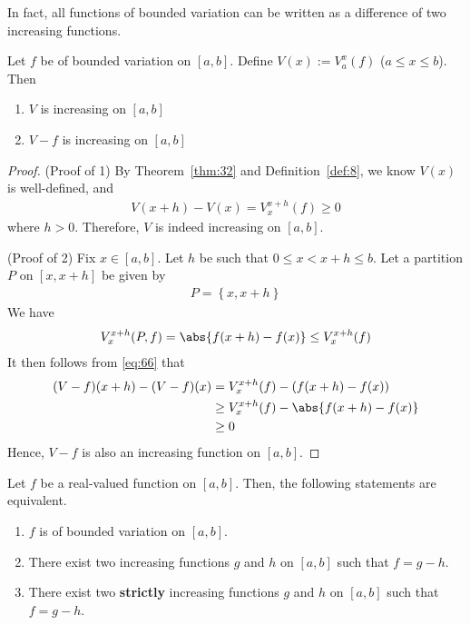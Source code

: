\documentclass[thmcnt=section, 12pt]{elegantbook}
\begin{document}

\par In fact, all functions of bounded variation can be written as a difference of two increasing functions.


\begin{lemma} \label{lem:3}
    Let $f$ be of bounded variation on $[a, b]$. Define $V(x) := V_a^x(f)$ ($a \leq x \leq b$). Then 
    \begin{enumerate}
        \item $V$ is increasing on $[a, b]$
        \item $V-f$ is increasing on $[a, b]$
    \end{enumerate}
\end{lemma}

\begin{proof}
    (Proof of 1) By Theorem~\ref{thm:32} and Definition~\ref{def:8}, we know $V(x)$ is well-defined, and 
    \begin{align*}
        V(x+h) - V(x) = V_x^{x+h}(f) \geq 0
    \end{align*}
    where $h > 0$. Therefore, $V$ is indeed increasing on $[a, b]$.

    \par (Proof of 2) Fix $x \in [a, b]$. Let $h$ be such that $0 \leq x < x+h \leq b$. Let a partition $P$ on $[x, x+h]$ be given by 
    \begin{align*}
        P = \left\{x, x+h\right\}
    \end{align*}
    We have 
    \begin{align}
        V_x^{x+h}(P, f) = \abs{f(x+h) - f(x)} 
        \leq V_x^{x+h}(f)
        \label{eq:66}
    \end{align}
    It then follows from \eqref{eq:66} that 
    \begin{align*}
        (V-f)(x+h) - (V-f)(x)
        &= V_x^{x+h}(f) - (f(x+h) - f(x)) \\ 
        &\geq V_x^{x+h}(f) - \abs{f(x+h) - f(x)} \\ 
        &\geq 0
    \end{align*}
    Hence, $V-f$ is also an increasing function on $[a, b]$.
\end{proof}


\begin{theorem} \label{thm:33}
    Let $f$ be a real-valued function on $[a, b]$. Then, the following statements are equivalent.
    \begin{enumerate}
        \item $f$ is of bounded variation on $[a, b]$.
        \item There exist two increasing functions $g$ and $h$ on $[a, b]$ such that $f = g - h$.
        \item There exist two \textbf{strictly} increasing functions $g$ and $h$ on $[a, b]$ such that $f = g - h$.
    \end{enumerate}
\end{theorem}
\end{document}
